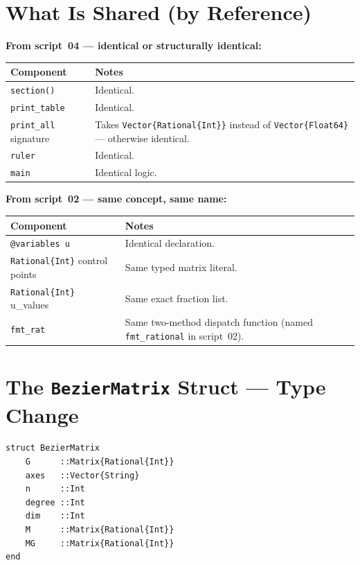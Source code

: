 \documentclass[12pt, a4paper]{article}
\newcommand{\cd}[1]{\texttt{#1}}
\begin{document}
\section{What Is Shared (by Reference)}

\begin{samebox}
\textbf{From script~04 --- identical or structurally identical:}

\medskip
\begin{tabular}{lp{8.5cm}}
\toprule
Component & Notes \\
\midrule
\cd{section()} & Identical. \\
\cd{print\_table} & Identical. \\
\cd{print\_all} signature & Takes \cd{Vector\{Rational\{Int\}\}}
  instead of \cd{Vector\{Float64\}} --- otherwise identical. \\
\cd{ruler} & Identical. \\
\cd{main} & Identical logic. \\
\bottomrule
\end{tabular}

\medskip
\textbf{From script~02 --- same concept, same name:}

\medskip
\begin{tabular}{lp{8.5cm}}
\toprule
Component & Notes \\
\midrule
\cd{@variables u} & Identical declaration. \\
\cd{Rational\{Int\}} control points & Same typed matrix literal. \\
\cd{Rational\{Int\}} u\_values & Same exact fraction list. \\
\cd{fmt\_rat} & Same two-method dispatch function
  (named \cd{fmt\_rational} in script~02). \\
\bottomrule
\end{tabular}
\end{samebox}


\section{The \texttt{BezierMatrix} Struct --- Type Change}

\begin{verbatim}
struct BezierMatrix
    G      ::Matrix{Rational{Int}}
    axes   ::Vector{String}
    n      ::Int
    degree ::Int
    dim    ::Int
    M      ::Matrix{Rational{Int}}
    MG     ::Matrix{Rational{Int}}
end
\end{verbatim}
\end{document}
